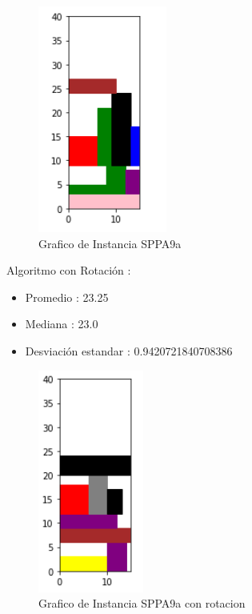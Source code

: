 \documentclass[10pt]{article}
\begin{document}
\begin{figure}[H]
\centerline{\includegraphics[width=0.5\linewidth]{1_sin_rotar.jpg}}
\caption{Grafico de Instancia SPPA9a }
\label{fig_1}
\end{figure}

Algoritmo con Rotación : %
\begin{itemize}%
\item%
Promedio : 23.25%
\item%
Mediana : 23.0%
\item%
Desviación estandar : 0.9420721840708386%
\end{itemize}%

\begin{figure}[H]
\centerline{\includegraphics[width=0.5\linewidth]{1_con_rotar.jpg}}
\caption{Grafico de Instancia SPPA9a con rotacion }
\label{fig_2}
\end{figure}
\end{document}
